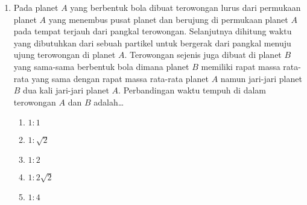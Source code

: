 \documentclass[A4,12PT, english, twocolumn]{journal}
\begin{document}
\begin{enumerate}
    
\newpage
\item Pada planet $A$ yang berbentuk bola dibuat terowongan lurus dari permukaan planet $A$ yang menembus pusat planet dan berujung di permukaan planet $A$ pada tempat terjauh dari pangkal terowongan. Selanjutnya dihitung waktu yang dibutuhkan dari sebuah partikel untuk  bergerak dari pangkal menuju ujung terowongan di planet $A$. Terowongan sejenis juga dibuat di planet $B$ yang sama-sama berbentuk bola dimana planet $B$ memiliki rapat massa rata-rata yang sama dengan rapat massa rata-rata planet $A$ namun jari-jari planet $B$ dua kali jari-jari planet $A$. Perbandingan waktu tempuh di dalam terowongan $A$ dan $B$ adalah\dots
    \begin{enumerate}
        \item $1:1$
        \item $1:\sqrt{2}$
        \item $1:2$
        \item $1:2\sqrt{2}$
        \item $1:4$
    \end{enumerate}
  

\end{enumerate}
\end{document}
